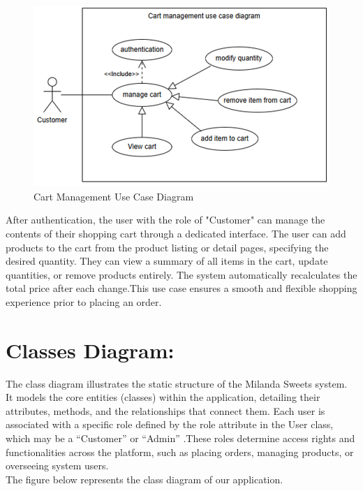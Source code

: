 \begin{figure}[!h]
\begin{center}
\includegraphics[width=14cm]{images/Cart Managment Use Case Diagram.png}
\end{center}
\caption{Cart Management Use Case Diagram}
\end{figure}

After authentication, the user with the role of "Customer" can manage the contents of their shopping cart through a dedicated interface. The user can add products to the cart from the product listing or detail pages, specifying the desired quantity. They can view a summary of all items in the cart, update quantities, or remove products entirely. The system automatically recalculates the total price after each change.This use case ensures a smooth and flexible shopping experience prior to placing an order.

\section{Classes Diagram:}

The class diagram illustrates the static structure of the Milanda Sweets system. It models the core entities (classes) within the application, detailing their attributes, methods, and the relationships that connect them. Each user is associated with a specific role defined by the role attribute in the User class, which may be a “Customer” or “Admin” .These roles determine access rights and functionalities across the platform, such as placing orders, managing products, or overseeing system users.\\

The figure below represents the class diagram of our application.\\

